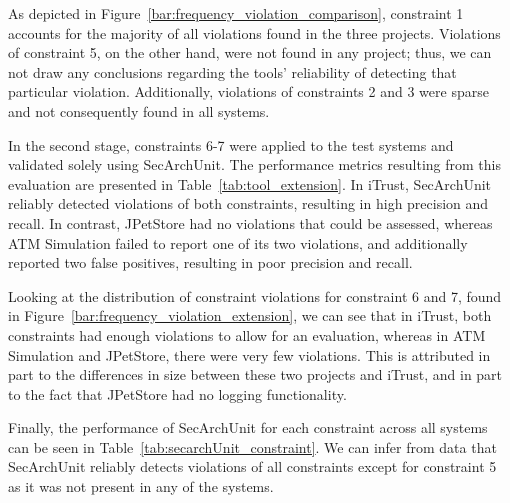 As depicted in Figure~\ref{bar:frequency_violation_comparison}, constraint 1 accounts for the majority of all violations found in the three projects. Violations of constraint 5, on the other hand, were not found in any project; thus, we can not draw any conclusions regarding the tools' reliability of detecting that particular violation. Additionally, violations of constraints 2 and 3 were sparse and not consequently found in all systems.



In the second stage, constraints 6-7 were applied to the test systems and validated solely using SecArchUnit. The performance metrics resulting from this evaluation are presented in Table~\ref{tab:tool_extension}. In iTrust, SecArchUnit reliably detected violations of both constraints, resulting in high precision and recall. In contrast, JPetStore had no violations that could be assessed, whereas ATM Simulation failed to report one of its two violations, and additionally reported two false positives, resulting in poor precision and recall.



Looking at the distribution of constraint violations for constraint 6 and 7, found in Figure~\ref{bar:frequency_violation_extension}, we can see that in iTrust, both constraints had enough violations to allow for an evaluation, whereas in ATM Simulation and JPetStore, there were very few violations. This is attributed in part to the differences in size between these two projects and iTrust, and in part to the fact that JPetStore had no logging functionality.



Finally, the performance of SecArchUnit for each constraint across all systems can be seen in Table~\ref{tab:secarchUnit_constraint}. We can infer from data that SecArchUnit reliably detects violations of all constraints except for constraint 5 as it was not present in any of the systems. 



